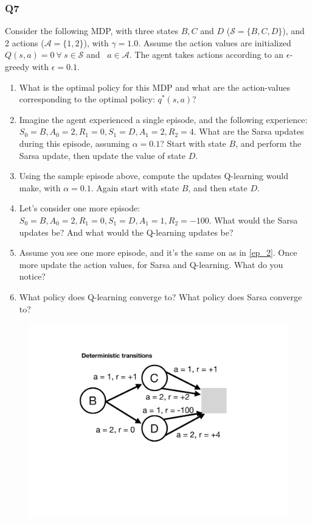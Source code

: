 \documentclass[a4paper, 10pt]{article}
\begin{document}
\subsubsection*{Q7}
Consider the following MDP, with three states $B, C$ and $D$ ($\mathcal{S} = \{B,C,D\}$), and 2 actions  ($\mathcal{A} = \{1,2\}$), with $\gamma = 1.0$.
Assume the action values are initialized $Q(s,a) = 0 ~\forall~ s\in\mathcal{S}$ and ~$a\in\mathcal{A}$. The agent takes actions according to an $\epsilon$-greedy with $\epsilon = 0.1$. 
\begin{enumerate}
\item What is the optimal policy for this MDP and what are the action-values corresponding to the optimal policy: $q^{*}(s,a)$?
\item Imagine the agent experienced a single episode, and the following experience: $S_0 = B, A_0 = 2, R_1 = 0, S_1 = D, A_1 = 2, R_2 = 4$. What are the Sarsa updates during this episode, assuming $\alpha = 0.1$? Start with state $B$, and perform the Sarsa update, then update the value of state $D$.
\item Using the sample episode above, compute the updates Q-learning would make, with $\alpha = 0.1$. Again start with state $B$, and then state $D$.
\item \label{ep_2} Let's consider one more episode: $S_0 = B, A_0 = 2, R_1 = 0, S_1 = D, A_1 = 1, R_2 = -100$. What would the Sarsa updates be? And what would the Q-learning updates be?
\item Assume you see one more episode, and it's the same on as in \ref{ep_2}. Once more update the action values, for Sarsa and Q-learning. What do you notice?
\item What policy does Q-learning converge to? What policy does Sarsa converge to?
\end{enumerate}
\begin{figure}[h!]
  \center
\includegraphics[width=0.5\linewidth]{figures/bcd.pdf}
\end{figure}
\end{document}
